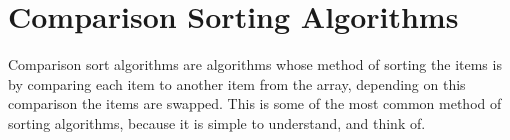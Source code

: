 \documentclass{subfile}
\begin{document}
\section{Comparison Sorting Algorithms}
Comparison sort algorithms are algorithms whose method of sorting the items is by comparing each item to another item from the array, depending on this comparison the items are swapped. This is some of the most common method of sorting algorithms, because it is simple to understand, and think of.  
\newpage


\end{document}
